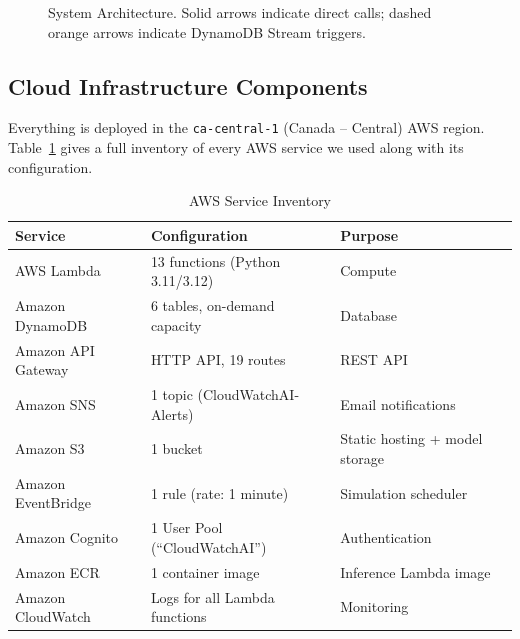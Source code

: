 \documentclass[11pt,a4paper]{article}
\begin{document}
\begin{figure}[H]
\captionsetup{justification=centering}
\caption{System Architecture. Solid arrows indicate direct calls; dashed orange arrows indicate DynamoDB Stream triggers.}
\label{fig:architecture}
\end{figure}

\subsection{Cloud Infrastructure Components}

Everything is deployed in the \texttt{ca-central-1} (Canada -- Central) AWS region. Table~\ref{tab:aws-services} gives a full inventory of every AWS service we used along with its configuration.

\begin{table}[H]
\centering
\begin{tabular}{lll}
\toprule
\textbf{Service} & \textbf{Configuration} & \textbf{Purpose} \\
\midrule
AWS Lambda & 13 functions (Python 3.11/3.12) & Compute \\
Amazon DynamoDB & 6 tables, on-demand capacity & Database \\
Amazon API Gateway & HTTP API, 19 routes & REST API \\
Amazon SNS & 1 topic (CloudWatchAI-Alerts) & Email notifications \\
Amazon S3 & 1 bucket & Static hosting + model storage \\
Amazon EventBridge & 1 rule (rate: 1 minute) & Simulation scheduler \\
Amazon Cognito & 1 User Pool (``CloudWatchAI'') & Authentication \\
Amazon ECR & 1 container image & Inference Lambda image \\
Amazon CloudWatch & Logs for all Lambda functions & Monitoring \\
\bottomrule
\end{tabular}
\caption{AWS Service Inventory}
\label{tab:aws-services}
\end{table}
\end{document}
